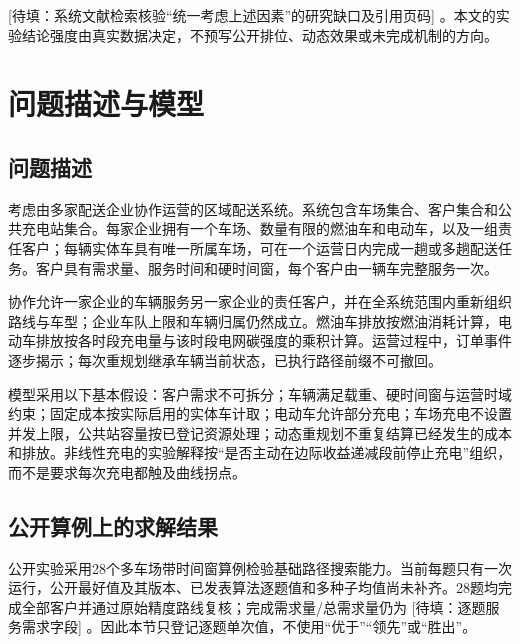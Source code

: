 \documentclass[UTF8]{setp-new}
\DeclareRobustCommand{\TBD}[1]{%
  \begingroup\setlength{\fboxsep}{1.2pt}%
  \colorbox{black!12}{\textcolor{black!65}{\textsf{\footnotesize[待填：#1]}}}%
  \endgroup}
\begin{document}
\TBD{系统文献检索核验“统一考虑上述因素”的研究缺口及引用页码}。本文的实验结论强度由真实数据决定，不预写公开排位、动态效果或未完成机制的方向。

\section{问题描述与模型}

\subsection{问题描述}

考虑由多家配送企业协作运营的区域配送系统。系统包含车场集合、客户集合和公共充电站集合。每家企业拥有一个车场、数量有限的燃油车和电动车，以及一组责任客户；每辆实体车具有唯一所属车场，可在一个运营日内完成一趟或多趟配送任务。客户具有需求量、服务时间和硬时间窗，每个客户由一辆车完整服务一次。

协作允许一家企业的车辆服务另一家企业的责任客户，并在全系统范围内重新组织路线与车型；企业车队上限和车辆归属仍然成立。燃油车排放按燃油消耗计算，电动车排放按各时段充电量与该时段电网碳强度的乘积计算。运营过程中，订单事件逐步揭示；每次重规划继承车辆当前状态，已执行路径前缀不可撤回。

模型采用以下基本假设：客户需求不可拆分；车辆满足载重、硬时间窗与运营时域约束；固定成本按实际启用的实体车计取；电动车允许部分充电；车场充电不设置并发上限，公共站容量按已登记资源处理；动态重规划不重复结算已经发生的成本和排放。非线性充电的实验解释按“是否主动在边际收益递减段前停止充电”组织，而不是要求每次充电都触及曲线拐点。



\subsection{公开算例上的求解结果}

公开实验采用28个多车场带时间窗算例检验基础路径搜索能力。当前每题只有一次运行，公开最好值及其版本、已发表算法逐题值和多种子均值尚未补齐。28题均完成全部客户并通过原始精度路线复核；完成需求量/总需求量仍为\TBD{逐题服务需求字段}。因此本节只登记逐题单次值，不使用“优于”“领先”或“胜出”。
\end{document}
